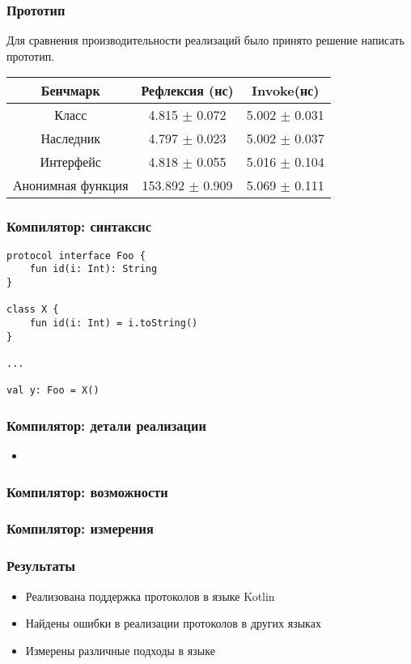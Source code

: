 \documentclass{beamer}
\begin{document}
\begin{frame}\frametitle{Прототип}
Для сравнения производительности реализаций было принято решение написать прототип.
\begin{table}[h]
\begin{tabular}{|c|c|c|} \hline
Бенчмарк & Рефлексия (нс) & Invoke(нс) \\ \hline
Класс & 4.815 $\pm$ 0.072 & 5.002 $\pm$ 0.031 \\ \hline
Наследник & 4.797 $\pm$ 0.023 & 5.002 $\pm$ 0.037 \\ \hline
Интерфейс & 4.818 $\pm$ 0.055 & 5.016 $\pm$ 0.104 \\ \hline
Анонимная функция & 153.892 $\pm$ 0.909 & 5.069 $\pm$ 0.111 \\ \hline
\end{tabular}
\end{table}
\end{frame}

\lstset{language=kotlin}
\begin{frame}[fragile]\frametitle{Компилятор: синтаксис}
\begin{lstlisting}
protocol interface Foo {
    fun id(i: Int): String
}

class X {
    fun id(i: Int) = i.toString()
}

...

val y: Foo = X()
\end{lstlisting}
\end{frame}

\begin{frame}\frametitle{Компилятор: детали реализации}
\begin{itemize}
    \item
\end{itemize}
\end{frame}

\begin{frame}\frametitle{Компилятор: возможности}
\end{frame}

\begin{frame}\frametitle{Компилятор: измерения}
\end{frame}

\begin{frame}\frametitle{Результаты}
\begin{itemize}
    \item Реализована поддержка протоколов в языке Kotlin
    \item Найдены ошибки в реализации протоколов в других языках
    \item Измерены различные подходы в языке
\end{itemize}
\end{frame}
\end{document}
